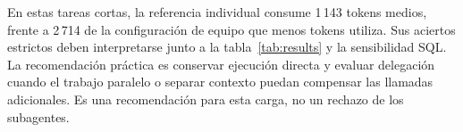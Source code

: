 En estas tareas cortas, la referencia individual consume 1\,143 tokens medios, frente a 2\,714 de la configuración de equipo que menos tokens utiliza. Sus aciertos estrictos deben interpretarse junto a la tabla~\ref{tab:results} y la sensibilidad SQL. La recomendación práctica es conservar ejecución directa y evaluar delegación cuando el trabajo paralelo o separar contexto puedan compensar las llamadas adicionales. Es una recomendación para esta carga, no un rechazo de los subagentes.
